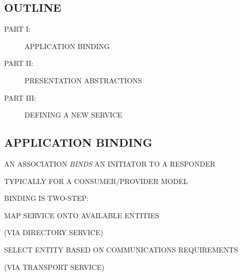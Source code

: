 

\begin{bwslide}
\part*	{OUTLINE}\bf

\begin{description}
\item[PART I:]	APPLICATION BINDING

\item[PART II:]	PRESENTATION ABSTRACTIONS

\item[PART III:] DEFINING A NEW SERVICE
\end{description}
\end{bwslide}


\begin{bwslide}
\part	{APPLICATION BINDING}\bf

\begin{nrtc}
\item	AN ASSOCIATION \emph{BINDS} AN INITIATOR TO A RESPONDER
    \begin{nrtc}
    \item	TYPICALLY FOR A CONSUMER/PROVIDER MODEL
    \end{nrtc}

\item	BINDING IS TWO-STEP:
    \begin{nrtc}
    \item	MAP SERVICE ONTO AVAILABLE ENTITIES
	\begin{nrtc}
	\item	 (VIA DIRECTORY SERVICE)
	\end{nrtc}

    \item	SELECT ENTITY BASED ON COMMUNICATIONS REQUIREMENTS
	\begin{nrtc}
	\item	 (VIA TRANSPORT SERVICE)
	\end{nrtc}
    \end{nrtc}
\end{nrtc}
\end{bwslide}


